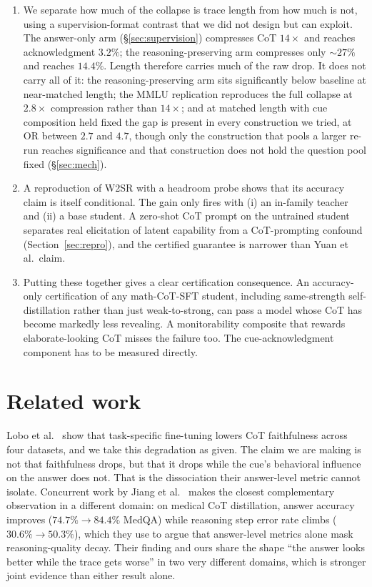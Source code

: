 \documentclass{article}
\begin{document}
\begin{enumerate}
\item We separate how much of the collapse is trace length from how much is
not, using a supervision-format contrast that we did not design but can
exploit. The answer-only arm (\S\ref{sec:supervision}) compresses CoT
$14\times$ and reaches acknowledgment $3.2\%$; the reasoning-preserving arm
compresses only ${\sim}27\%$ and reaches $14.4\%$. Length therefore carries
much of the raw drop. It does not carry all of it: the reasoning-preserving arm
sits significantly below baseline at near-matched length; the MMLU replication
reproduces the full collapse at $2.8\times$ compression rather than
$14\times$; and at matched length with cue composition held fixed the gap is
present in every construction we tried, at $\mathrm{OR}$ between $2.7$ and
$4.7$, though only the construction that pools a larger re-run reaches
significance and that construction does not hold the question pool fixed
(\S\ref{sec:mech}).

\item A reproduction of W2SR with a headroom probe shows that its accuracy
claim is itself conditional. The gain only fires with (i) an in-family teacher
and (ii) a base student. A zero-shot CoT prompt on the untrained student
separates real elicitation of latent capability from a CoT-prompting confound
(Section~\ref{sec:repro}), and the certified guarantee is narrower than Yuan
et al.\ claim.

\item Putting these together gives a clear certification consequence. An
accuracy-only certification of any math-CoT-SFT student, including
same-strength self-distillation rather than just weak-to-strong, can pass a
model whose CoT has become markedly less revealing. A monitorability composite
that rewards elaborate-looking CoT misses the failure too. The
cue-acknowledgment component has to be measured directly.

\end{enumerate}

\section{Related work}
\label{sec:related}

Lobo et al.~\cite{lobo2024} show that task-specific fine-tuning lowers CoT
faithfulness across four datasets, and we take this degradation as given. The
claim we are making is not that faithfulness drops, but that it drops while the
cue's behavioral influence on the answer does not. That is the dissociation
their answer-level metric cannot isolate. Concurrent work by Jiang et
al.~\cite{jiang2026meddistill} makes the closest complementary observation in
a different domain: on medical CoT distillation, answer accuracy improves
($74.7\% \to 84.4\%$ MedQA) while reasoning step error rate climbs
($30.6\% \to 50.3\%$), which they use to argue that answer-level metrics
alone mask reasoning-quality decay. Their finding and ours share the shape
``the answer looks better while the trace gets worse'' in two very different
domains, which is stronger joint evidence than either result alone.
\end{document}
